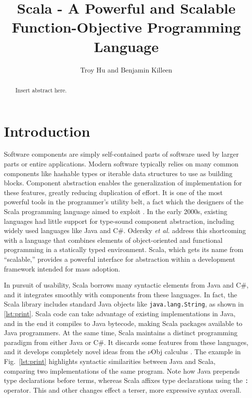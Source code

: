 \documentclass[jou,apacite]{IEEEtran}
\title{Scala - A Powerful and Scalable Function-Objective Programming Language}
\author{Troy Hu and Benjamin Killeen} %
\begin{document}
\maketitle    
\begin{abstract}
Insert abstract here.
\end{abstract}                     

\section{Introduction}
\label{sec:intro}

Software components are simply self-contained parts of software used by larger
parts or entire applications. Modern software typically relies on many common
components like hashable types or iterable data structures to use as building
blocks. Component abstraction enables the generalization of implementation for
these features, greatly reducing duplication of effort. It is one of the most
powerful tools in the programmer's utility belt, a fact which the designers of
the Scala programming language aimed to exploit \cite{odersky2004overview}. In
the early 2000s, existing languages had little support for type-sound component
abstraction, including widely used languages like Java and C\#. Odersky \emph{et
  al.} address this shortcoming with a language that combines elements of
object-oriented and functional programming in a statically typed
environment. Scala, which gets its name from ``scalable,'' provides a powerful
interface for abstraction within a development framework intended for mass
adoption.

In pursuit of usability, Scala borrows many syntactic elements from Java and
C\#, and it integrates smoothly with components from these languages. In fact,
the Scala library includes standard Java objects like \texttt{java.lang.String},
as shown in \ref{lst:print}. Scala code can take advantage of existing
implementations in Java, and in the end it compiles to Java bytecode, making
Scala packages available to Java programmers. At the same time, Scala maintains
a distinct programming paradigm from either Java or C\#. It discards some
features from these languages, and it develops completely novel ideas from the
$\nu$Obj calculus \cite{odersky_nominal_2003}. The example in
Fig.~\ref{lst:print} highlights syntactic similarities between Java and Scala,
comparing two implementations of the same program. Note how Java prepends type
declarations before terms, whereas Scala affixes type declarations using the
\texttt{:} operator. This and other changes effect a terser, more expressive
syntax overall.
\end{document}
